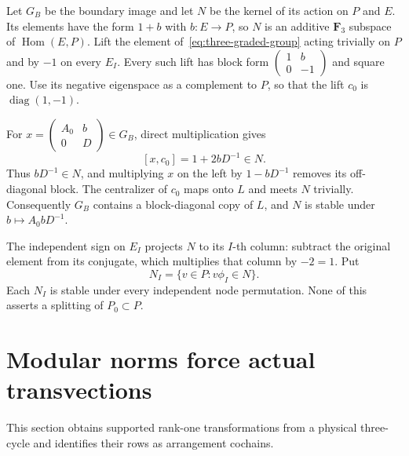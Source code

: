 Let $G_B$ be the boundary image and let $N$ be the kernel of its action on $P$ and $E$. Its elements have the form $1+b$ with $b:E\to P$, so $N$ is an additive $\mathbf F_3$ subspace of $\operatorname{Hom}(E,P)$. Lift the element of~\eqref{eq:three-graded-group} acting trivially on $P$ and by $-1$ on every $E_I$. Every such lift has block form $\left(\begin{smallmatrix}1&b\\0&-1\end{smallmatrix}\right)$ and square one. Use its negative eigenspace as a complement to $P$, so that the lift $c_0$ is $\operatorname{diag}(1,-1)$.

For $x=\left(\begin{smallmatrix}A_0&b\\0&D\end{smallmatrix}\right)\in G_B$, direct multiplication gives
\[
[x,c_0]=1+2bD^{-1}\in N.
\]
Thus $bD^{-1}\in N$, and multiplying $x$ on the left by $1-bD^{-1}$ removes its off-diagonal block. The centralizer of $c_0$ maps onto $L$ and meets $N$ trivially. Consequently $G_B$ contains a block-diagonal copy of $L$, and $N$ is stable under $b\mapsto A_0bD^{-1}$.

The independent sign on $E_I$ projects $N$ to its $I$-th column: subtract the original element from its conjugate, which multiplies that column by $-2=1$. Put
\[
N_I=\{v\in P:v\phi_I\in N\}.
\]
Each $N_I$ is stable under every independent node permutation. None of this asserts a splitting of $P_0\subset P$.

\section{Modular norms force actual transvections}\label{sec:higher-three-force}
This section obtains supported rank-one transformations from a physical three-cycle and identifies their rows as arrangement cochains.

